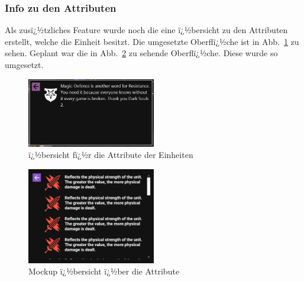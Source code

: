 \documentclass[12pt, titlepage]{scrartcl}
\newcommand{\Abb}[1]{%
	Abb.\ \ref{#1}%
}
\begin{document}
			\subsubsection{Info zu den Attributen}
			Als zusï¿½tzliches Feature wurde noch die eine ï¿½bersicht zu den Attributen erstellt, welche die Einheit besitzt. Die umgesetzte Oberflï¿½che ist in \Abb{AttributInfo} zu sehen. Geplant war die in \Abb{MockupAttribute} zu sehende Oberflï¿½che. Diese wurde so umgesetzt.
			
			\begin{figure}[H] 
				\centering
				\includegraphics[width=0.5\textwidth]{Attribute_Info_final.PNG}
				\caption{ï¿½bersicht fï¿½r die Attribute der Einheiten}
				\label{AttributInfo}
			\end{figure}
		
			\begin{figure}[H] 
				\centering
				\includegraphics[width=0.5\textwidth]{InfoView.png}
				\caption{Mockup ï¿½bersicht ï¿½ber die Attribute}
				\label{MockupAttribute}
			\end{figure}
		
\end{document}

